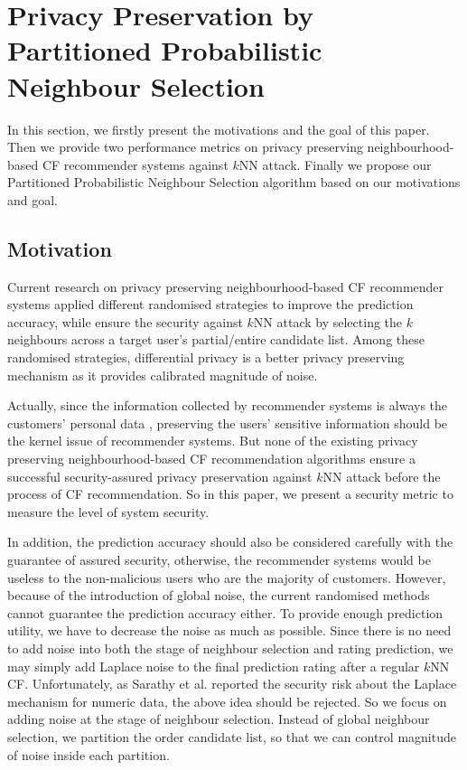 \documentclass[11pt]{article}
\begin{document}
\section{Privacy Preservation by Partitioned Probabilistic Neighbour Selection}
\label{SCH}
In this section, we firstly present the motivations and the goal of this paper. Then we provide two performance metrics on privacy preserving neighbourhood-based CF recommender systems against $k$NN attack. Finally we propose our Partitioned Probabilistic Neighbour Selection algorithm based on our motivations and goal.

\subsection{Motivation}
Current research \cite{MCSHERRY2009,ZHU2014,ADAMOPOULOS2014} on privacy preserving neighbourhood-based CF recommender systems applied different randomised strategies to improve the prediction accuracy, while ensure the security against $k$NN attack by selecting the $k$ neighbours across a target user's partial/entire candidate list. Among these randomised strategies, differential privacy is a better privacy preserving mechanism as it provides calibrated magnitude of noise.

Actually, since the information collected by recommender systems is always the customers' personal data \cite{CALANDRINO2011}, preserving the users' sensitive information should be the kernel issue of recommender systems. But none of the existing privacy preserving neighbourhood-based CF recommendation algorithms ensure a successful security-assured privacy preservation against $k$NN attack before the process of CF recommendation. So in this paper, we present a security metric to measure the level of system security.

In addition, the prediction accuracy should also be considered carefully with the guarantee of assured security, otherwise, the recommender systems would be useless to the non-malicious users who are the majority of customers. However, because of the introduction of global noise, the current randomised methods cannot guarantee the prediction accuracy either. To provide enough prediction utility, we have to decrease the noise as much as possible. Since there is no need to add noise into both the stage of neighbour selection and rating prediction, we may simply add Laplace noise \cite{DWORK2006} to the final prediction rating after a regular $k$NN CF. Unfortunately, as Sarathy et al. \cite{SARATHY2011} reported the security risk about the Laplace mechanism for numeric data, the above idea should be rejected. So we focus on adding noise at the stage of neighbour selection. Instead of global neighbour selection, we partition the order candidate list, so that we can control magnitude of noise inside each partition.
\end{document}
